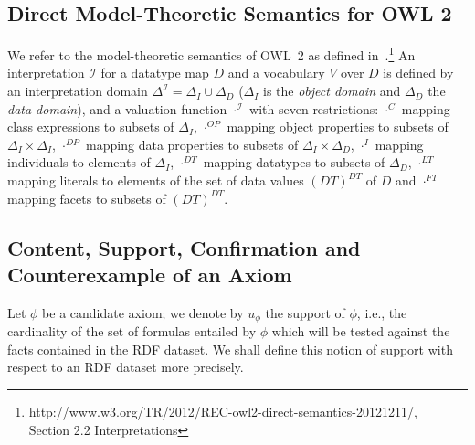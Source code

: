 \documentclass{llncs}
\begin{document}
\subsection{Direct Model-Theoretic Semantics for OWL 2}
We refer to the model-theoretic semantics of OWL~2 as defined in~\cite{OWL2-direct-semantics}.\footnote{http://www.w3.org/TR/2012/REC-owl2-direct-semantics-20121211/, \\Section 2.2 Interpretations}
An interpretation $\mathcal{I}$ for a datatype map $D$ and a vocabulary $V$ over $D$ is defined by an interpretation domain $\Delta^\mathcal{I}=\Delta_{I}\cup\Delta_{D}$  ($\Delta_{I}$ is the \textit{object domain} and $\Delta_{D}$ the \textit{data domain}), and a valuation function $\cdot^{\mathcal{I}}$ with seven restrictions: $\cdot^{C}$ mapping class expressions to subsets of $\Delta_{I}$,  $\cdot^{OP}$ mapping object properties to subsets of $\Delta_{I}\times\Delta_{I}$, $\cdot^{DP}$ mapping data properties to subsets of $\Delta_{I}\times\Delta_{D}$, $\cdot^{I}$ mapping individuals to elements of $\Delta_{I}$, $\cdot^{DT}$ mapping datatypes to subsets of $\Delta_{D}$, $\cdot^{LT}$ mapping literals to elements of the set of data values $(DT)^{DT}$ of $D$ and $\cdot^{FT}$ mapping facets to subsets of $(DT)^{DT}$.

\subsection{Content, Support, Confirmation and Counterexample of an Axiom}
 
Let $\phi$ be a candidate axiom; we denote by $u_\phi$ the support of $\phi$,
i.e., the cardinality of the set of formulas entailed by $\phi$ which will be tested
against the facts contained in the RDF dataset.
We shall define this notion of support with respect to an RDF dataset more precisely.

\end{document}
